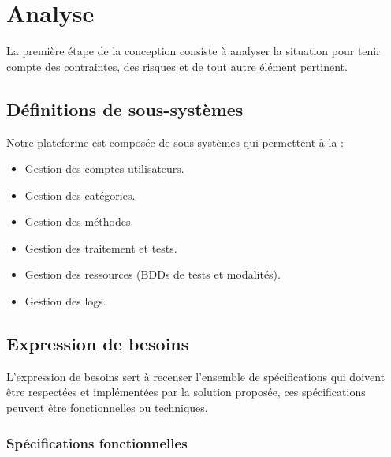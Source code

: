 \section{Analyse}
La première étape de la conception consiste à analyser la situation pour tenir compte des contraintes, des risques et de tout autre élément pertinent.
\subsection{Définitions de sous-systèmes}
Notre plateforme est composée de sous-systèmes qui permettent à la :
\begin{itemize}
\item Gestion des comptes utilisateurs.
\item Gestion des catégories.  
\item Gestion des méthodes. 
\item Gestion des traitement et tests.  
\item Gestion des ressources (BDDs de tests et modalités). 
\item Gestion des logs. 
\end{itemize}



\subsection{Expression de besoins}
L'expression de besoins sert à recenser l'ensemble de spécifications qui doivent être respectées et implémentées par la solution proposée, ces spécifications peuvent être fonctionnelles ou techniques.
\subsubsection{Spécifications fonctionnelles}

